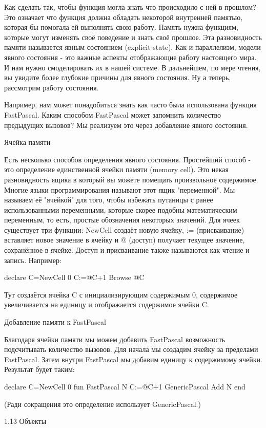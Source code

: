 Как сделать так, чтобы функция могла знать что происходило с ней в прошлом? Это означает что функция должна обладать некоторой внутренней памятью, которая бы помогала ей выполнять свою работу. Память нужна функциям, которые могут изменять своё поведение и знать своё прошлое. Эта разновидность памяти называется явным состоянием (explicit state). Как и параллелизм, модели явного состояния - это важные аспекты отображающие работу настоящего мира. И нам нужно смоделировать их в нашей системе. В дальнейшем, по мере чтения, вы увидите более глубокие причины для явного состояния. Ну а теперь, рассмотрим работу состояния.

Например, нам может понадобиться знать как часто была использована функция FastPascal. Каким способом FastPascal может запомнить количество предыдущих вызовов? Мы реализуем это через добавление явного состояния.

Ячейка памяти

Есть несколько способов определения явного состояния. Простейший способ - это определение единственной ячейки памяти (memory cell). Это некая разновидность ящика в который вы можете помещать произвольное содержимое. Многие языки программирования называют этот ящик "переменной". Мы называем её "ячейкой" для того, чтобы избежать путаницы с ранее использованными переменными, которые скорее подобны математическим переменным, то есть, простые обозначения некоторых значений. Для ячеек существует три функции: NewCell создаёт новую ячейку, := (присваивание) вставляет новое значение в ячейку и @ (доступ) получает текущее значение, сохранённое в ячейке. Доступ и присваивание также называются как чтение и запись. Например:

declare
C={NewCell 0}
C:=@C+1
{Browse @C}

Тут создаётся ячейка C с инициализирующим содержимым 0, содержимое увеличивается на единицу и отображается содержимое ячейки C.

Добавление памяти к FastPascal

Благодаря ячейки памяти мы можем добавить FastPascal возможность подсчитывать количество вызовов. Для начала мы создадим ячейку за пределами FastPascal. Затем внутри FastPascal мы добавим единицу к содержимому ячейки. Результат будет таким:

declare
C={NewCell 0}
fun {FastPascal N}
C:=@C+1
{GenericPascal Add N}
end

(Ради сокращения это определение использует GenericPascal.)

1.13 Объекты

